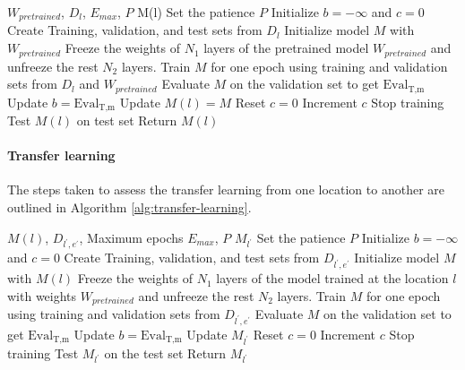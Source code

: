 \documentclass{ieeeaccess}
\begin{document}
\begin{algorithm}[!ht]
\caption{Training model from pretrained networks by freezing some layers and fine-tuning the rest (S3)}
\label{alg:freeze}
\begin{algorithmic}[1]
\REQUIRE $W_{pretrained}$, $D_{\textit{l}}$, $E_{max}$, $P$
\ENSURE M(l)
\STATE Set the patience $P$ 
\STATE Initialize $\textit{b} = -\infty$ and $\textit{c} = 0$
\STATE Create Training, validation, and test sets from $D_{\textit{l}}$
\STATE Initialize model $M$ with  $W_{pretrained}$
\STATE Freeze the weights of $N_{1}$ layers of the pretrained model $W_{pretrained}$ and unfreeze the rest $N_2$ layers. 
    \STATE Train $M$ for one epoch using training and validation sets from $D_{\textit{l}}$ and $W_{pretrained}$ 
    \STATE Evaluate $M$ on the validation set to get $\text{Eval}_{\text{T},\text{m}}$  
        \STATE Update $b = \text{Eval}_{\text{T},\text{m}}$
        \STATE Update $M(l)=M$
        \STATE Reset $c = 0$
    \ELSE
        \STATE Increment $c$
    \ENDIF
        \STATE Stop training
        \STATE Test $M(l)$ on test set
        \STATE Return $M(l)$
    \ENDIF
\ENDFOR
\end{algorithmic}
\end{algorithm}
\vspace{0.2cm}

\paragraph{Transfer learning}
The steps taken to assess the transfer learning from one location to another are outlined in Algorithm \ref{alg:transfer-learning}.

\begin{algorithm}[!ht]
\caption{Transfer learning Algorithm}
\label{alg:transfer-learning}
\begin{algorithmic}[1]
\REQUIRE $M(l)$, $D_{\textit{l}^{\prime},\textit{e}^{\prime}}$, Maximum epochs $E_{max}$, $P$
\ENSURE $M_{l^{\prime}}$
\STATE Set the patience $P$ 
\STATE Initialize $\textit{b} = -\infty$ and $\textit{c} = 0$
\STATE Create Training, validation, and test sets from $D_{\textit{l}^{\prime},\textit{e}^{\prime}}$
\STATE Initialize model $M$ with  $M(l)$
\STATE Freeze the weights of $N_{1}$ layers of the model trained at the location $l$ with weights $W_{pretrained}$ and unfreeze the rest $N_2$ layers. 
    \STATE Train $M$ for one epoch using training and validation sets from $D_{\textit{l}^{\prime},\textit{e}^{\prime}}$
    \STATE Evaluate $M$ on the validation set to get $\text{Eval}_{\text{T},\text{m}}$  
        \STATE Update $b = \text{Eval}_{\text{T},\text{m}}$
        \STATE Update $M_{l^{\prime}}$
        \STATE Reset $c = 0$
    \ELSE
        \STATE Increment $c$
    \ENDIF
        \STATE Stop training
        \STATE Test $M_{l^{\prime}}$ on the test set
        \STATE Return $M_{l^{\prime}}$
    \ENDIF
\ENDFOR
\end{algorithmic}
\end{algorithm}
\end{document}
